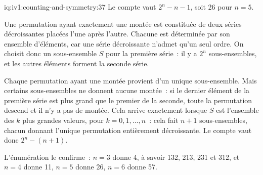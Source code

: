 \enlargethispage{-3\baselineskip}%
\begin{solution}{iq:iv1:counting-and-symmetry:37}
Le compte vaut $2^n - n - 1$, soit 26 pour $n = 5$.

Une permutation ayant exactement une montée est constituée de deux séries décroissantes placées l'une après l'autre. Chacune est déterminée par son ensemble d'éléments, car une série décroissante n'admet qu'un seul ordre. On choisit donc un sous-ensemble $S$ pour la première série~: il y a $2^n$ sous-ensembles, et les autres éléments forment la seconde série.

Chaque permutation ayant une montée provient d'un unique sous-ensemble. Mais certains sous-ensembles ne donnent aucune montée~: si le dernier élément de la première série est plus grand que le premier de la seconde, toute la permutation descend et il n'y a pas de montée. Cela arrive exactement lorsque $S$ est l'ensemble des $k$ plus grandes valeurs, pour $k = 0, 1, \dots, n$~: cela fait $n + 1$ sous-ensembles, chacun donnant l'unique permutation entièrement décroissante. Le compte vaut donc $2^n - (n + 1)$.

L'énumération le confirme~: $n = 3$ donne 4, à savoir 132, 213, 231 et 312, et $n = 4$ donne 11, $n = 5$ donne 26, $n = 6$ donne 57.

\end{solution}

